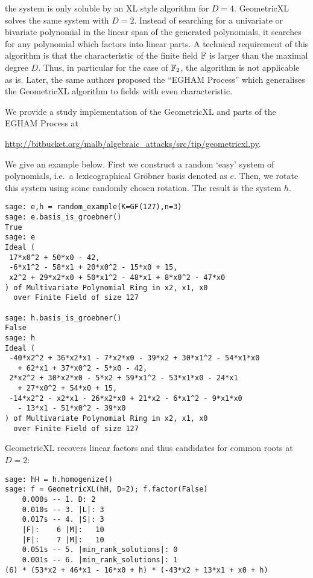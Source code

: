the system is only soluble by an XL style algorithm for $D=4$. GeometricXL solves the same system with $D=2$. Instead of
searching for a univariate or bivariate polynomial in the linear span of the generated polynomials, it searches for any polynomial which factors into linear parts. A technical requirement of this algorithm is that the characteristic of the finite field $\mathbb{F}$ is larger than the maximal
degree $D$. Thus, in particular for the case of $\mathbb{F}_2$, the algorithm is not applicable as is. Later, the same authors proposed the ``EGHAM Process'' \cite{murphy-paterson:ccc2009} which generalises the GeometricXL algorithm to fields with even characteristic.

We provide a study implementation of the GeometricXL and parts of the EGHAM Process  at
\begin{center}
\url{http://bitbucket.org/malb/algebraic_attacks/src/tip/geometricxl.py}.
\end{center}
We give an example below. First we construct a random `easy' system of polynomials, i.e.\ a lexicographical Gröbner basis denoted as $e$. Then, we rotate this system using some randomly chosen rotation. The result is the system $h$.

\begin{lstlisting}
sage: e,h = random_example(K=GF(127),n=3)
sage: e.basis_is_groebner()
True
sage: e
Ideal (
 17*x0^2 + 50*x0 - 42, 
 -6*x1^2 - 58*x1 + 20*x0^2 - 15*x0 + 15, 
 x2^2 + 29*x2*x0 + 50*x1^2 - 48*x1 + 8*x0^2 - 47*x0
) of Multivariate Polynomial Ring in x2, x1, x0 
  over Finite Field of size 127

sage: h.basis_is_groebner()
False
sage: h
Ideal (
 -40*x2^2 + 36*x2*x1 - 7*x2*x0 - 39*x2 + 30*x1^2 - 54*x1*x0 
   + 62*x1 + 37*x0^2 - 5*x0 - 42, 
 2*x2^2 + 30*x2*x0 - 5*x2 + 59*x1^2 - 53*x1*x0 - 24*x1 
   + 27*x0^2 + 54*x0 + 15, 
 -14*x2^2 - x2*x1 - 26*x2*x0 + 21*x2 - 6*x1^2 - 9*x1*x0 
   - 13*x1 - 51*x0^2 - 39*x0
) of Multivariate Polynomial Ring in x2, x1, x0 
  over Finite Field of size 127
\end{lstlisting}

GeometricXL recovers linear factors and thus candidates for common roots at $D=2$:

\begin{lstlisting}
sage: hH = h.homogenize()
sage: f = GeometricXL(hH, D=2); f.factor(False)
    0.000s -- 1. D: 2
    0.010s -- 3. |L|: 3
    0.017s -- 4. |S|: 3
    |F|:    6 |M|:   10
    |F|:    7 |M|:   10
    0.051s -- 5. |min_rank_solutions|: 0
    0.001s -- 6. |min_rank_solutions|: 1
(6) * (53*x2 + 46*x1 - 16*x0 + h) * (-43*x2 + 13*x1 + x0 + h)
\end{lstlisting}

